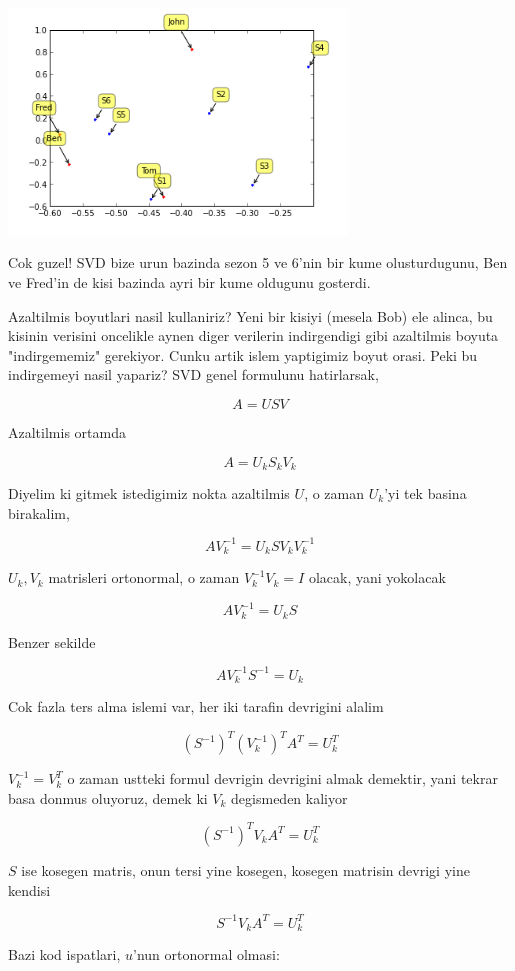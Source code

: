 \documentclass[12pt,fleqn]{article}\usepackage{../common}
\begin{document}
\includegraphics[height=6cm]{svdrecom_1.png}

Cok guzel! SVD bize urun bazinda sezon 5 ve 6'nin bir kume
olusturdugunu, Ben ve Fred'in de kisi bazinda ayri bir kume oldugunu
gosterdi.

Azaltilmis boyutlari nasil kullaniriz? Yeni bir kisiyi (mesela Bob)
ele alinca, bu kisinin verisini oncelikle aynen diger verilerin
indirgendigi gibi azaltilmis boyuta "indirgememiz" gerekiyor. Cunku
artik islem yaptigimiz boyut orasi. Peki bu indirgemeyi nasil yapariz?
SVD genel formulunu hatirlarsak,

$$ A = USV $$

Azaltilmis ortamda

$$ A = U_k S_k V_k $$

Diyelim ki gitmek istedigimiz nokta azaltilmis $U$, o zaman $U_k$'yi tek
basina birakalim,

$$ A V_k^{-1} = U_k S V_k V_k^{-1} $$

$U_k,V_k$ matrisleri ortonormal, o zaman $V_k^{-1}V_k = I$ olacak,
yani yokolacak

$$ A V_k^{-1} = U_k S  $$

Benzer sekilde

$$  A V_k^{-1} S^{-1} = U_k $$

Cok fazla ters alma islemi var, her iki tarafin devrigini alalim

$$ (S^{-1})^T (V_k^{-1})^T A^T = U_k^T $$

$V_k^{-1} = V_k^T$ o zaman ustteki formul devrigin devrigini almak
demektir, yani tekrar basa donmus oluyoruz, demek ki $V_k$ degismeden
kaliyor

$$ (S^{-1})^T V_k A^T = U_k^T $$

$S$ ise kosegen matris, onun tersi yine kosegen, kosegen matrisin devrigi
yine kendisi

$$ S^{-1} V_k A^T = U_k^T $$

Bazi kod ispatlari, $u$'nun ortonormal olmasi:
\end{document}
